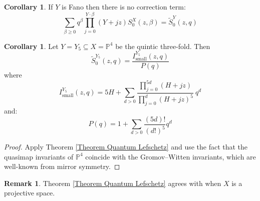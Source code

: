 \documentclass[10pt]{amsart}
\newcommand{\PP}{\mathbb P}
\theoremstyle{definition}
\newtheorem{cor}[thm]{Corollary}
\theoremstyle{definition}
\newtheorem{remark}[thm]{Remark}
\begin{document}
\begin{cor}
 If $Y$ is Fano then there is no correction term:
\begin{equation*} \sum_{\beta\geq 0} q^\beta\prod_{j=0}^{Y\cdot\beta}(Y+jz)S_0^X(z,\beta) = \tilde{S}_0^Y(z,q) \end{equation*}
\end{cor}

\begin{cor}
Let $Y = Y_5 \subseteq  X = \PP^4$ be the quintic three-fold. Then
\begin{equation*} \tilde{S}_0^{Y_5}(z,q)=\dfrac{I_{\text{small}}^{Y_5}(z,q)}{P(q)} \end{equation*}
where
\begin{equation*} I_{\text{small}}^{Y_5}(z,q)=5H+\sum_{d>0}\frac{\prod_{j=0}^{5d}(H+jz)}{\prod_{j=0}^{d}(H+jz)^5} \ q^d \end{equation*}
and:
\begin{equation*} P(q)=1+\sum_{d>0}\frac{(5d)!}{(d!)^5}q^d \end{equation*}
\end{cor}
\begin{proof} Apply Theorem \ref{Theorem Quantum Lefschetz} and use the fact that the quasimap invariants of $\PP^4$ coincide with the Gromov--Witten invariants, which are well-known from mirror symmetry. \end{proof}

\begin{remark}
Theorem \ref{Theorem Quantum Lefschetz} agrees with \cite[Theorem~1]{CZ-mirror} when $X$ is a projective space.
\end{remark}
\end{document}
